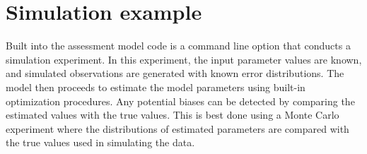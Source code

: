 \documentclass[12pt,letterpaper]{article}
\begin{document}


  
  \section{Simulation example} %
  \label{sec:simulation_example}
  
  Built into the assessment model code is a command line option that conducts a simulation experiment.  In this experiment, the input parameter values are known, and simulated observations are generated with known error distributions. The model then proceeds to estimate the model parameters using built-in optimization procedures.  Any potential biases can be detected by comparing the estimated values with the true values. This is best done using a Monte Carlo experiment where the distributions of estimated parameters are compared with the true values used in simulating the data.
\end{document}
